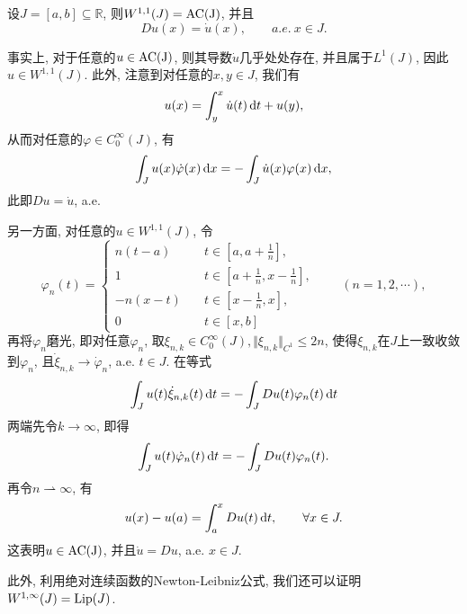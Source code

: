\begin{example}
    设$J = [a, b] \subseteq \mathbb{R}$, 则$W^{1, 1}(J) = {\rm AC(J)}$, 并且
    \begin{equation*}
        Du(x) = \dot u(x), \qquad a.e. \ x \in J.
    \end{equation*}

    事实上, 对于任意的$u \in {\rm AC(J)}$, 则其导数$\dot u$几乎处处存在, 并且属于$L^1(J)$, 因此$u \in W^{1, 1}(J)$.
    此外, 注意到对任意的$x, y \in J$, 我们有 
    \begin{equation*}
        u(x) = \int_y^x\dot u(t) \,{\rm d}t + u(y),
    \end{equation*}
    从而对任意的$\varphi \in C_0^{\infty}(J)$, 有
    \begin{equation*}
        \int_Ju(x)\dot \varphi(x) \,{\rm d}x = -\int_J\dot u(x)\varphi(x) \,{\rm d}x,
    \end{equation*}
    此即$Du = \dot u$, a.e.

    另一方面, 对任意的$u \in W^{1, 1}(J)$, 令 
    \begin{equation*}
        \varphi_n(t) = 
        \begin{cases}
            \displaystyle n(t - a) \quad &t \in \left[a, a + \frac{1}{n}\right], \\ 
            \displaystyle 1 \quad &t \in \left[a + \frac{1}{n}, x - \frac{1}{n}\right], \\ 
            \displaystyle -n(x - t) \quad &t \in \left[x - \frac{1}{n}, x\right], \\ 
            0 \quad &t \in [x, b]
        \end{cases}
        \qquad (n = 1, 2, \cdots),
    \end{equation*}
    再将$\varphi_n$磨光, 即对任意$\varphi_n$, 取$\xi_{n, k} \in C_0^{\infty}(J), \Vert \xi_{n, k} \Vert_{C^1} \leq 2n$, 使得$\xi_{n, k}$在$J$上一致收敛到$\varphi_n$, 且$\dot\xi_{n, k} \rightarrow \dot \varphi_n$, a.e. $t \in J$.
    在等式 
    \begin{equation*}
        \int_Ju(t)\dot\xi_{n, k}(t) \,{\rm d}t = -\int_JDu(t)\varphi_n(t) \,{\rm d}t
    \end{equation*}
    两端先令$k \rightarrow \infty$, 即得 
    \begin{equation*}
        \int_Ju(t)\dot\varphi_n(t) \,{\rm d}t = -\int_JDu(t)\varphi_n(t).
    \end{equation*}
    再令$n \rightharpoonup \infty$, 有 
    \begin{equation*}
        u(x) - u(a) = \int_a^xDu(t) \,{\rm d}t, \qquad \forall x \in J.
    \end{equation*}
    这表明$u \in {\rm AC(J)}$, 并且$\dot u = Du$, a.e. $x \in J$.

    此外, 利用绝对连续函数的Newton-Leibniz公式, 我们还可以证明$W^{1, \infty}(J) = {\rm Lip}(J)$.
\end{example}

